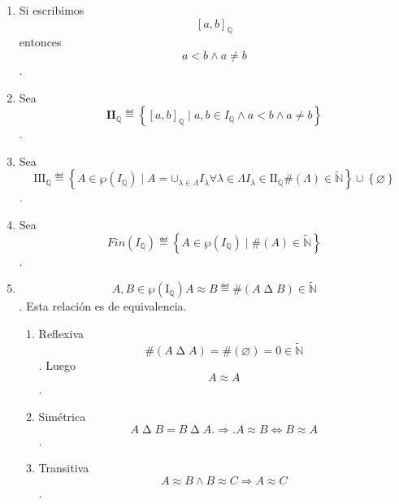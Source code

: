 \begin{enumerate}
\begin{enumerate}
    \begin{enumerate}
    \def\labelenumiii{\arabic{enumiii}.}
    \item
      Si escribimos \[\left\lbrack {a,b} \right\rbrack_{\mathbb{Q}}\]
      entonces \[{a < {b \land a}} \neq b\].
    \item
      Sea
      \[\mathbf{II}_{\mathbb{Q}} ≝ \left\{ {\left\lbrack {a,b} \right\rbrack_{\mathbb{Q}} \mid {a,{{{b \in {I_{\mathbb{Q}} \land a}} < {b \land a}} \neq b}}} \right\}\].
    \item
      Sea
      \[\mathbf{\mathrm{III}}_{\mathbb{Q}} ≝ {\left\{ {{A \in {\wp\left( I_{\mathbb{Q}} \right)}} \mid {{A = \mathbf{\cup}_{\lambda \in \Lambda}}I_{\lambda}\forall{\lambda \in \Lambda}{I_{\lambda} \in {\mathbf{\mathrm{II}}_{\mathbb{Q}}{{\#\left( \Lambda \right)} \in \widetilde{\mathbb{N}}}}}}} \right\} \cup \left\{ \varnothing \right\}}\]
      .
    \item
      Sea
      \[\mathit{Fin}\left( I_{\mathbb{Q}} \right) ≝ \left\{ {{A \in \wp}\left( I_{\mathbb{Q}} \right) \mid \#{(A) \in \widetilde{\mathbb{N}}}} \right\}\].
    \item
      \[A,B{\in}{\wp\left( \mathbf{\mathrm{I}}_{\mathbb{Q}} \right)}{A \approx B} ≝ {\#{\left( {A \mathbin{\Delta} B} \right) \in \widetilde{\mathbb{N}}}}\].
      Esta relación es de equivalencia.

      \begin{enumerate}
      \def\labelenumiv{\arabic{enumiv}.}
      \item
        Reflexiva
        \[\#{\left( {A \mathbin{\Delta} A} \right) = \#}{{(\varnothing) = 0} \in \widetilde{\mathbb{N}}}\].
        Luego \[A \approx A\].
      \item
        Simétrica
        \[A \mathbin{\Delta} {B = B} \mathbin{\Delta} A.\Rightarrow.A \approx B\Leftrightarrow B \approx A\].
      \item
        Transitiva
        \[A \approx {B \land B} \approx C\Rightarrow A \approx C\].


\end{enumerate}
\end{enumerate}
\end{enumerate}
\end{enumerate}
